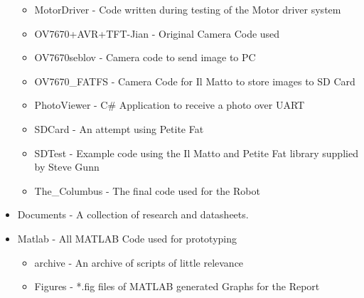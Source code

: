 \begin{itemize}
\begin{itemize}
\item MotorDriver - Code written during testing of the Motor driver system
\item OV7670+AVR+TFT-Jian - Original Camera Code used
\item OV7670seblov - Camera code to send image to PC
\item OV7670\_FATFS - Camera Code for Il Matto to store images to SD Card
\item PhotoViewer - C\# Application to receive a photo over UART
\item SDCard - An attempt using Petite Fat
\item SDTest - Example code using the Il Matto and Petite Fat library supplied by Steve Gunn
\item The\_Columbus - The final code used for the Robot
\end{itemize}
\item Documents - A collection of research and datasheets. 
\item Matlab - All MATLAB Code used for prototyping
\begin{itemize}
\item archive - An archive of scripts of little relevance
\item Figures - *.fig files of MATLAB generated Graphs for the Report

\end{itemize}
\end{itemize}

